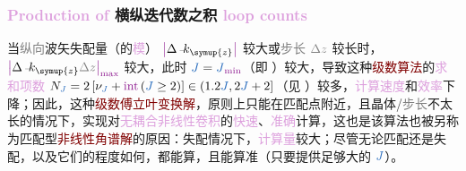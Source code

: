 \subsubsection{\textcolor{Plum}{Production of} 横纵迭代数之积 \textcolor{Plum}{loop counts}}\label{sssec:Chord_IJ_product}

当\textcolor{gray}{纵向}\textcolor{PineGreen}{波矢失配量}（的\textcolor{Plum}{模}） $\textcolor{Plum}{\left|\textcolor{black}{\Delta \xint{\begin{smallmatrix} ~ \\ {}^{}_{\mathcolor{gray}{-}} \\ ~ \end{smallmatrix}}{15}{k}_{\symup{z}}}\right|}$ 较大或\textcolor{gray}{步长} $\mathcolor{gray}{\Delta z}$ 较长时，$\textcolor{Plum}{\left|\textcolor{black}{\Delta \xint{\begin{smallmatrix} ~ \\ {}^{}_{\mathcolor{gray}{-}} \\ ~ \end{smallmatrix}}{15}{k}_{\symup{z}} \mathcolor{gray}{\Delta z}}\right|_{\max}}$ 较大，此时 $\textcolor{NavyBlue}{J} = \textcolor{NavyBlue}{J}_{\textcolor{Plum}{\min}}$（即 ）较大，导致这种\textcolor{Maroon}{级数算法}的\textcolor{Plum}{求和项数} $N_{\textcolor{NavyBlue}{J}} = 2 \left[ {\nu}_{\textcolor{NavyBlue}{J}} + \text{\textcolor{Plum}{int}} \left({\textcolor{NavyBlue}{J}} \geq 2 \right) \right] \in \left( 1.2 {\textcolor{NavyBlue}{J}}, 2 {\textcolor{NavyBlue}{J}} + 2 \right]$（见 ）较多，\textcolor{Plum}{计算速度}和\textcolor{Plum}{效率}下降；因此，这种\textcolor{Maroon}{级数傅立叶变换解}，原则上只能在\textcolor{PineGreen}{匹配点}附近，且\textcolor{PineGreen}{晶体}/\textcolor{gray}{步长}不太长的情况下，实现对\textcolor{Plum}{无耦合}\textcolor{Plum}{非线性卷积}的\textcolor{Plum}{快速}、\textcolor{Plum}{准确}计算，这也是该算法也被另称为\textcolor{PineGreen}{匹配型}\textcolor{Maroon}{非线性角谱解}的原因：\textcolor{PineGreen}{失配}情况下，\textcolor{Plum}{计算量}较大；尽管无论\textcolor{PineGreen}{匹配}还是\textcolor{PineGreen}{失配}，以及它们的程度如何，都能算，且能算准（只要提供足够大的 $\textcolor{NavyBlue}{J}$）。

